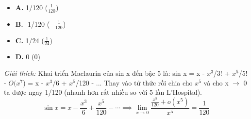 \documentclass[11pt,a4paper,oneside]{book}
\begin{document}
\begin{enumerate}[label=\textbf{Câu \arabic*:}, leftmargin=2.2em, itemsep=8pt]
  \begin{itemize}[label={}, leftmargin=1em, itemsep=2pt]
    \item \textbf{A.} 1/120 \quad ($\frac{1}{120}$)
    \item \textbf{B.} -1/120 \quad ($-\frac{1}{120}$)
    \item \textbf{C.} 1/24 \quad ($\frac{1}{24}$)
    \item \textbf{D.} 0 \quad ($0$)
  \end{itemize}
  \vspace{2pt}
   \textit{Giải thích:} Khai triển Maclaurin của sin x đến bậc 5 là: sin x = x - $x^3$/3! + $x^5$/5! - $O(x^7$) = x - $x^3$/6 + $x^5$/120 - ... Thay vào tử thức rồi chia cho $x^5$ và cho x $\to$  0 ta được ngay 1/120 (nhanh hơn rất nhiều so với 5 lần L'Hospital).
  \[ \sin x = x - \frac{x^3}{6} + \frac{x^5}{120} - \cdots \implies \lim_{x \to 0} \frac{\frac{x^5}{120} + o(x^5)}{x^5} = \frac{1}{120} \]
\end{enumerate}
\end{document}
